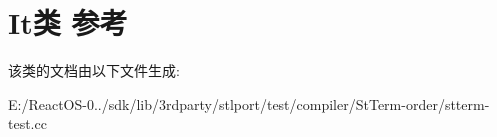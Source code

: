 \hypertarget{class_it}{}\section{It类 参考}
\label{class_it}


该类的文档由以下文件生成\+:\begin{DoxyCompactItemize}
\item 
E\+:/\+React\+O\+S-\/0../sdk/lib/3rdparty/stlport/test/compiler/\+St\+Term-\/order/stterm-\/test.\+cc\end{DoxyCompactItemize}
